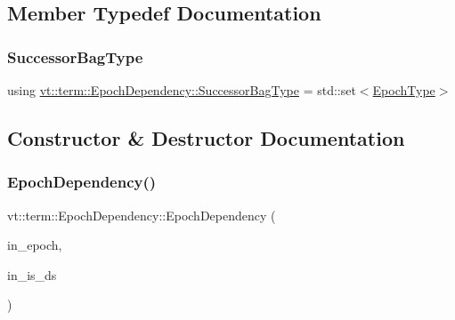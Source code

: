 \subsection{Member Typedef Documentation}
\mbox{\label{structvt_1_1term_1_1_epoch_dependency_a3f00b47c33158f3241ebbeb0a0cb7b1d}} 
\subsubsection{\texorpdfstring{Successor\+Bag\+Type}{SuccessorBagType}}
{\footnotesize\ttfamily using \hyperlink{structvt_1_1term_1_1_epoch_dependency_a3f00b47c33158f3241ebbeb0a0cb7b1d}{vt\+::term\+::\+Epoch\+Dependency\+::\+Successor\+Bag\+Type} =  std\+::set$<$\hyperlink{namespacevt_a985a5adf291c34a3ca263b3378388236}{Epoch\+Type}$>$}



\subsection{Constructor \& Destructor Documentation}
\mbox{\label{structvt_1_1term_1_1_epoch_dependency_ac02fe388ef8c1b7097a453e0fcef5bbc}} 
\subsubsection{\texorpdfstring{Epoch\+Dependency()}{EpochDependency()}}
{\footnotesize\ttfamily vt\+::term\+::\+Epoch\+Dependency\+::\+Epoch\+Dependency (\begin{DoxyParamCaption}\item[{\hyperlink{namespacevt_a985a5adf291c34a3ca263b3378388236}{Epoch\+Type}}]{in\+\_\+epoch,  }\item[{bool}]{in\+\_\+is\+\_\+ds }\end{DoxyParamCaption})\hspace{0.3cm}{\ttfamily [inline]}}



